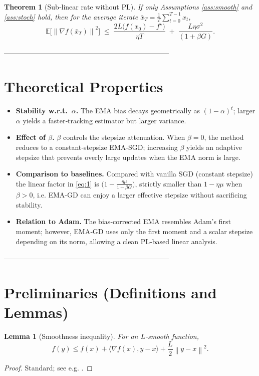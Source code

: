 \documentclass{article}
\newtheorem{theorem}{Theorem}
\newtheorem{lemma}{Lemma}
\newcommand{\EE}{\mathbb{E}}
\newcommand{\norm}[1]{\left\lVert #1\right\rVert}
\newcommand{\grad}{\nabla}
\begin{document}
\begin{theorem}[Sub‑linear rate without PL]\label{thm:sublinear}
If only Assumptions \ref{ass:smooth} and \ref{ass:stoch} hold, then for the average iterate $\bar x_{T}= \frac{1}{T}\sum_{t=0}^{T-1}x_{t}$,
\[
    \EE\!\bigl[\norm{\grad f(\bar x_{T})}^{2}\bigr]\;\le\;
    \frac{2L\bigl(f(x_{0})-f^{\star}\bigr)}{\eta T}
    \;+\;
    \frac{L\eta\sigma^{2}}{(1+\beta G)}.
\tag{2}
\]
\end{theorem}

-----------------------------------------------------------------------

\section*{Theoretical Properties}
\begin{itemize}[leftmargin=*,nosep]
    \item \textbf{Stability w.r.t.\ $\alpha$.} The EMA bias decays geometrically as $(1-\alpha)^{t}$; larger $\alpha$ yields a faster‐tracking estimator but larger variance.
    \item \textbf{Effect of $\beta$.} $\beta$ controls the stepsize attenuation. When $\beta=0$, the method reduces to a constant‑stepsize EMA‑SGD; increasing $\beta$ yields an adaptive stepsize that prevents overly large updates when the EMA norm is large.
    \item \textbf{Comparison to baselines.} Compared with vanilla SGD (constant stepsize) the linear factor in \eqref{eq:1} is $\bigl(1-\frac{\eta\mu}{1+\beta G}\bigr)$, strictly smaller than $1-\eta\mu$ when $\beta>0$, i.e. EMA‑GD can enjoy a larger effective stepsize without sacrificing stability.
    \item \textbf{Relation to Adam.} The bias‑corrected EMA resembles Adam’s first moment; however, EMA‑GD uses only the first moment and a scalar stepsize depending on its norm, allowing a clean PL‑based linear analysis.
\end{itemize}

-----------------------------------------------------------------------

\section*{Preliminaries (Definitions and Lemmas)}
\begin{lemma}[Smoothness inequality]\label{lem:smooth}
For an $L$‑smooth function,
\[
    f(y)\le f(x)+\langle\grad f(x),y-x\rangle+\frac{L}{2}\norm{y-x}^{2}.
\]
\end{lemma}
\begin{proof}
Standard; see e.g. \cite{Nesterov2004}.
\end{proof}
\end{document}
